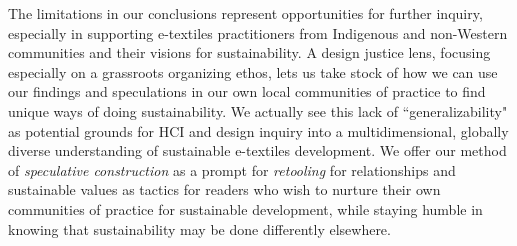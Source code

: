 The limitations in our conclusions represent opportunities for further inquiry, especially in supporting e-textiles practitioners from Indigenous and non-Western communities and their visions for sustainability. A design justice lens, focusing especially on a grassroots organizing ethos, lets us take stock of how we can use our findings and speculations in our own local communities of practice to find unique ways of doing sustainability. We actually see this lack of ``generalizability" as potential grounds for HCI and design inquiry into a multidimensional, globally diverse understanding of sustainable e-textiles development. 
We offer our method of \textit{speculative construction} as a prompt for \textit{retooling} for relationships and sustainable values as tactics for readers who wish to nurture their own communities of practice for sustainable development,  while staying humble in knowing that sustainability may be done differently elsewhere.




